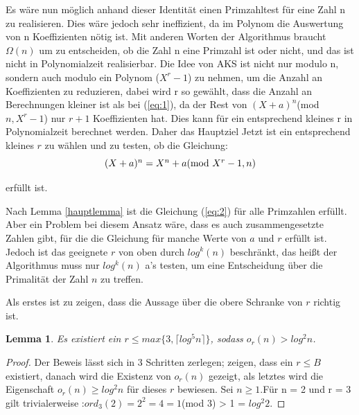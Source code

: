 \documentclass[12pt,oneside]{article}
\newtheorem{lemma}[theorem]{Lemma}
\theoremstyle{remark}
\theoremstyle{definition}
\begin{document}
\begin{flushleft}
Es wäre nun möglich anhand dieser Identität einen Primzahltest für eine Zahl n zu realisieren. Dies wäre jedoch sehr ineffizient, da im Polynom die Auswertung von n Koeffizienten nötig ist. Mit anderen Worten der Algorithmus braucht $\Omega(n)$ um zu entscheiden, ob die Zahl n eine Primzahl ist oder nicht, und das ist nicht in Polynomialzeit realisierbar. Die Idee von AKS ist nicht nur modulo n, sondern auch modulo ein Polynom ($X^r -1$) zu nehmen, um die Anzahl an Koeffizienten zu reduzieren, dabei wird r so gewählt, dass die Anzahl an Berechnungen kleiner ist als bei (\ref{eq:1}), da der Rest von $(X + a)^n$(mod $ n, X^r - 1$) nur $ r + 1$ Koeffizienten hat. Dies kann für ein entsprechend kleines r in Polynomialzeit berechnet werden. Daher das Hauptziel Jetzt ist ein entsprechend kleines $r$ zu wählen und zu testen, ob die Gleichung:\newline\newline
\begin{equation}\label{eq:2}
    \centerline{$(X + a)^n = X^n + a $(mod $X^r - 1, n$)}
\end{equation}

erfüllt ist.\newline

Nach Lemma \ref{hauptlemma} ist die Gleichung (\ref{eq:2}) für alle Primzahlen erfüllt. Aber ein Problem bei diesem Ansatz wäre, dass es auch zusammengesetzte Zahlen gibt, für die die Gleichung für manche Werte von $a$ und $r$ erfüllt ist. Jedoch ist das geeignete $r$ von oben durch $log^k(n)$ beschränkt, das heißt der Algorithmus muss nur $log^k(n)$ a's testen, um eine Entscheidung über die Primalität der Zahl $n$ zu treffen.

Als erstes ist zu zeigen, dass die Aussage über die obere Schranke von $r$ richtig ist.


\begin{lemma}
Es existiert ein $ r \leq max \{ 3, \lceil log^5 n \rceil \}$, sodass $o_{r}(n) > log^2 n$.
\end{lemma}

\begin{proof}
Der Beweis lässt sich in 3 Schritten zerlegen; zeigen, dass ein $r \leq B$ existiert, danach wird die Existenz von $o_{r}(n)$ gezeigt, als letztes wird die Eigenschaft $o_{r}(n) \geq log^2 n$ für dieses $r$ bewiesen. 
Sei $n \geq 1$.\newline\newline Für n = 2 und r = 3 gilt trivialerweise :\newline\newline $ord_{3}(2) = 2^2 = 4 = 1 $(mod 3) > 1 = $log^2 2$.


\end{proof}
\end{flushleft}
\end{document}
